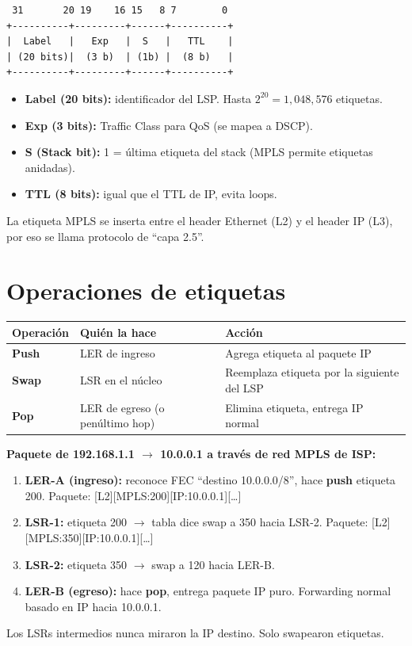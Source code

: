 \begin{lstlisting}
 31       20 19    16 15   8 7        0
+----------+---------+------+----------+
|  Label   |   Exp   |  S   |   TTL    |
| (20 bits)|  (3 b)  | (1b) |  (8 b)   |
+----------+---------+------+----------+
\end{lstlisting}

\begin{itemize}
    \item \textbf{Label (20 bits):} identificador del LSP. Hasta $2^{20} = 1{,}048{,}576$ etiquetas.
    \item \textbf{Exp (3 bits):} Traffic Class para QoS (se mapea a DSCP).
    \item \textbf{S (Stack bit):} 1 = última etiqueta del stack (MPLS permite etiquetas anidadas).
    \item \textbf{TTL (8 bits):} igual que el TTL de IP, evita loops.
\end{itemize}

La etiqueta MPLS se inserta entre el header Ethernet (L2) y el header IP (L3),
por eso se llama protocolo de ``capa 2.5''.

\section{ Operaciones de etiquetas}

\begin{center}
\begin{tabular}{lll}
\toprule
\textbf{Operación} & \textbf{Quién la hace} & \textbf{Acción} \\
\midrule
\textbf{Push}  & LER de ingreso  & Agrega etiqueta al paquete IP \\
\textbf{Swap}  & LSR en el núcleo & Reemplaza etiqueta por la siguiente del LSP \\
\textbf{Pop}   & LER de egreso (o penúltimo hop) & Elimina etiqueta, entrega IP normal \\
\bottomrule
\end{tabular}
\end{center}

\begin{ejemplo}
\textbf{Paquete de 192.168.1.1 $\to$ 10.0.0.1 a través de red MPLS de ISP:}
\begin{enumerate}
    \item \textbf{LER-A (ingreso):} reconoce FEC ``destino 10.0.0.0/8'', hace \textbf{push}
          etiqueta 200. Paquete: [L2][MPLS:200][IP:10.0.0.1][\ldots]
    \item \textbf{LSR-1:} etiqueta 200 $\to$ tabla dice swap a 350 hacia LSR-2.
          Paquete: [L2][MPLS:350][IP:10.0.0.1][\ldots]
    \item \textbf{LSR-2:} etiqueta 350 $\to$ swap a 120 hacia LER-B.
    \item \textbf{LER-B (egreso):} hace \textbf{pop}, entrega paquete IP puro.
          Forwarding normal basado en IP hacia 10.0.0.1.
\end{enumerate}
Los LSRs intermedios nunca miraron la IP destino. Solo swapearon etiquetas.
\end{ejemplo}

